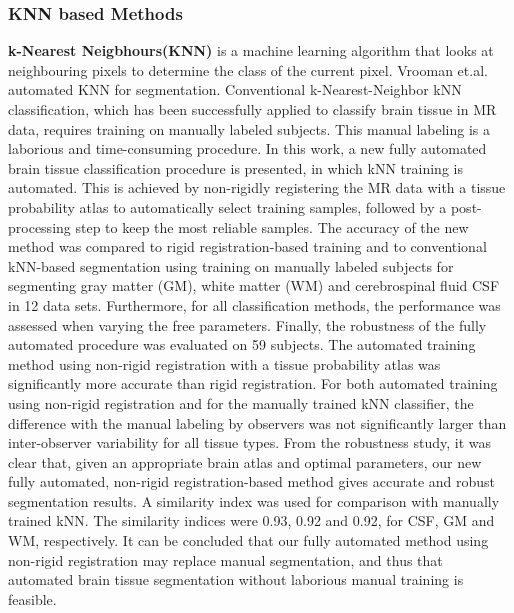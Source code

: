 \documentclass[19pt]{article}
\begin{document}
\subsubsection{KNN based Methods}
\textbf{k-Nearest Neigbhours(KNN)} is a machine learning algorithm that looks at neighbouring pixels to determine the class of the current pixel.
Vrooman et.al. \cite{vrooman2007multi} automated KNN for segmentation. Conventional k-Nearest-Neighbor kNN classification, which has been successfully applied to classify brain tissue in MR data, requires training on manually labeled subjects. This manual labeling is a laborious and time-consuming procedure. In this work, a new fully automated brain tissue classification procedure is presented, in which kNN training is automated. This is achieved by non-rigidly registering the MR data with a tissue probability atlas to automatically select training samples, followed by a post-processing step to keep the most reliable samples. The accuracy of the new method was compared to rigid registration-based training and to conventional kNN-based segmentation using training on manually labeled subjects for segmenting gray matter (GM), white matter (WM) and cerebrospinal fluid CSF in 12 data sets. Furthermore, for all classification methods, the performance was assessed when varying the free parameters. Finally, the robustness of the fully automated procedure was evaluated on 59 subjects. The automated training method using non-rigid registration with a tissue probability atlas was significantly more accurate than rigid registration. For both automated training using non-rigid registration and for the manually trained kNN classifier, the difference with the manual labeling by observers was not significantly larger than inter-observer variability for all tissue types. From the robustness study, it was clear that, given an appropriate brain atlas and optimal parameters, our new fully automated, non-rigid registration-based method gives accurate and robust segmentation results. A similarity index was used for comparison with manually trained kNN. The similarity indices were 0.93, 0.92 and 0.92, for CSF, GM and WM, respectively. It can be concluded that our fully automated method using non-rigid registration may replace manual segmentation, and thus that automated brain tissue segmentation without laborious manual training is feasible.
\end{document}
